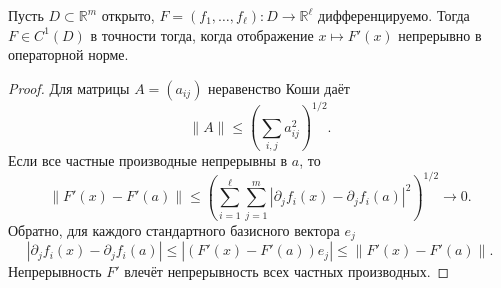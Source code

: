 \label{ticket:09}

\begin{theorem}
Пусть $D\subset\mathbb R^m$ открыто, $F=(f_1,\ldots,f_\ell):D\to\mathbb R^\ell$ дифференцируемо.
Тогда $F\in C^1(D)$ в точности тогда, когда отображение $x\mapsto F'(x)$ непрерывно в операторной норме.
\end{theorem}

\begin{proof}
Для матрицы $A=(a_{ij})$ неравенство Коши даёт
\[
  \|A\|\le\left(\sum_{i,j}a_{ij}^2\right)^{1/2}.
\]
Если все частные производные непрерывны в $a$, то
\[
  \|F'(x)-F'(a)\|
  \le\left(\sum_{i=1}^\ell\sum_{j=1}^m
    |\partial_j f_i(x)-\partial_j f_i(a)|^2\right)^{1/2}
  \longrightarrow0.
\]
Обратно, для каждого стандартного базисного вектора $e_j$
\[
  |\partial_j f_i(x)-\partial_j f_i(a)|
  \le|(F'(x)-F'(a))e_j|
  \le\|F'(x)-F'(a)\|.
\]
Непрерывность $F'$ влечёт непрерывность всех частных производных.
\end{proof}
